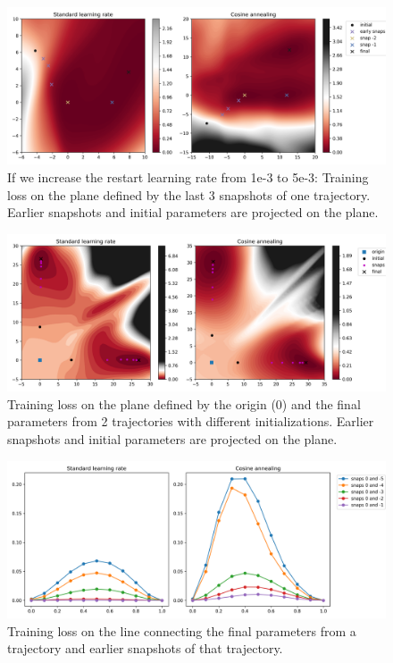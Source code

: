 \begin{figure}[H]
	\centering
	\includegraphics[width=1\linewidth]{./figs/planes_large_max_lr.png}  
	\caption{If we increase the restart learning rate from 1e-3 to 5e-3: Training loss on the plane defined by the last 3 snapshots of one trajectory. Earlier snapshots and initial parameters are projected on the plane.}
	\label{}
\end{figure}

\begin{figure}[H]
	\centering
	\includegraphics[width=1\linewidth]{./figs/origin_planes.png}  
	\caption{Training loss on the plane defined by the origin (0) and the final parameters from 2 trajectories with different initializations. Earlier snapshots and initial parameters are projected on the plane.}
	\label{}
\end{figure}

\begin{figure}[H]
	\centering
	\includegraphics[width=1\linewidth]{./figs/line_plots.png}  
	\caption{Training loss on the line connecting the final parameters from a trajectory and earlier snapshots of that trajectory.}
	\label{}
\end{figure}

